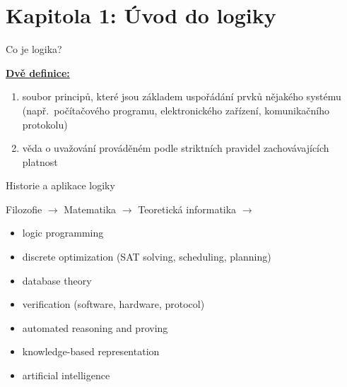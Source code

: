 \documentclass{beamer}
\begin{document}
\section{\sc Kapitola 1: Úvod do logiky}


\begin{frame}{Co je logika?}

    
    \href{https://www.google.com/search?q=define+logic}{\textbf{Dvě definice:}}
        \begin{enumerate}
            \item soubor principů, které jsou základem uspořádání prvků nějakého systému (např.\ počítačového programu, elektronického zařízení, komunikačního protokolu)
            \item věda o uvažování prováděném podle striktních pravidel zachovávajících platnost 
        \end{enumerate}        



\end{frame}


\begin{frame}{Historie a aplikace logiky}

    {\footnotesize Filozofie $\to$}  {\normalsize Matematika $\to$}  {\large Teoretická informatika $\to$} 
        

    \begin{itemize}
        \item logic programming
        \item discrete optimization (SAT solving, scheduling, planning)
        \item database theory
        \item verification (software, hardware, protocol)
        \item automated reasoning and proving
        \item knowledge-based representation
        \item artificial intelligence
    \end{itemize}

\end{frame}
\end{document}
